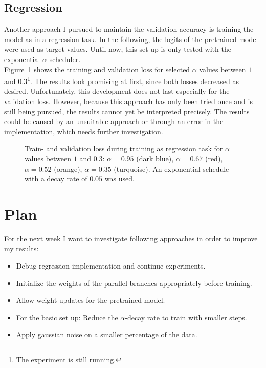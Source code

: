 \documentclass[10pt,twocolumn,letterpaper]{article}
\begin{document}
\subsection{Regression}
Another approach I pursued to maintain the validation accuracy is training the model as in a regression task.
In the following, the logits of the pretrained model were used as target values.
Until now, this set up is only tested with the exponential $\alpha$-scheduler.\\
Figure~\ref{fig:loss_regression} shows the training and validation loss for selected $\alpha$ values between $1$ and $0.3$\footnote{The experiment is still running.}.
The results look promising at first, since both losses decreased as desired.
Unfortunately, this development does not last especially for the validation loss.
However, because this approach has only been tried once and is still being pursued, the results cannot yet be interpreted precisely.
The results could be caused by an unsuitable approach or through an error in the implementation, which needs further investigation.
\begin{figure}[hpbt]
	\centering
	\hspace{0.1\textwidth}
	\caption[]{Train- and validation loss during training as regression task for $\alpha$ values between $1$ and $0.3$: $\alpha=0.95$ (dark blue), $\alpha=0.67$ (red), $\alpha=0.52$ (orange), $\alpha=0.35$ (turquoise).
	An exponential schedule with a decay rate of $0.05$ was used.}
	\label{fig:loss_regression}
\end{figure}

\section{Plan}
For the next week I want to investigate following approaches in order to improve my results:
\begin{itemize}
	\item Debug regression implementation and continue experiments.
	\item Initialize the weights of the parallel branches appropriately before training.
	\item Allow weight updates for the pretrained model.
	\item For the basic set up: Reduce the $\alpha$-decay rate to train with smaller steps.
	\item Apply gaussian noise on a smaller percentage of the data.
\end{itemize}
\end{document}
